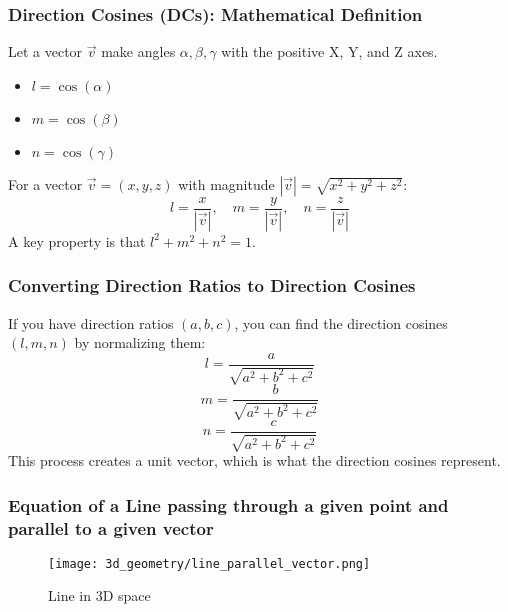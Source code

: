 \begin{frame}
    \frametitle{Direction Cosines (DCs): Mathematical Definition}
    Let a vector \(\vec{v}\) make angles \(\alpha, \beta, \gamma\) with the positive X, Y, and Z axes.
    \begin{itemize}
        \item \(l = \cos(\alpha)\)
        \item \(m = \cos(\beta)\)
        \item \(n = \cos(\gamma)\)
    \end{itemize}

    For a vector \(\vec{v} = (x, y, z)\) with magnitude \(|\vec{v}| = \sqrt{x^2 + y^2 + z^2}\):
    \[ l = \frac{x}{|\vec{v}|}, \quad m = \frac{y}{|\vec{v}|}, \quad n = \frac{z}{|\vec{v}|} \]
    A key property is that \(l^2 + m^2 + n^2 = 1\).
\end{frame}

\begin{frame}
    \frametitle{Converting Direction Ratios to Direction Cosines}
    If you have direction ratios \((a, b, c)\), you can find the direction cosines \((l, m, n)\) by normalizing them:
    \[ l = \frac{a}{\sqrt{a^2 + b^2 + c^2}} \]
    \[ m = \frac{b}{\sqrt{a^2 + b^2 + c^2}} \]
    \[ n = \frac{c}{\sqrt{a^2 + b^2 + c^2}} \]
    This process creates a unit vector, which is what the direction cosines represent.
\end{frame}


\begin{frame}
    \frametitle{Equation of a Line passing through a given point and parallel to a given vector}
    \begin{figure}
        \texttt{[image: 3d\_geometry/line\_parallel\_vector.png]}
        \caption{Line in 3D space}
    \end{figure}
\end{frame}


